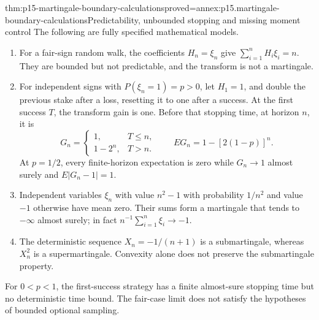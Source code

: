 \begin{hbtheorem}{thm:p15-martingale-boundary-calculations}{proved=annex:p15.martingale-boundary-calculations}{Predictability, unbounded stopping and missing moment control}
The following are fully specified mathematical models.
\begin{enumerate}
\item For a fair-sign random walk, the coefficients \(H_n=\xi_n\)
      give \(\sum_{i=1}^nH_i\xi_i=n\). They are bounded but not predictable,
      and the transform is not a martingale.
\item For independent signs with \(P(\xi_n=1)=p>0\), let \(H_1=1\),
      and double the previous stake after a loss, resetting it to one
      after a success. At the first success \(T\), the transform gain is one.
      Before that stopping time, at horizon \(n\), it is
      \[
        G_n=\begin{cases}1,&T\leq n,\\1-2^n,&T>n.\end{cases}
        \qquad EG_n=1-[2(1-p)]^n.
      \]
      At \(p=1/2\), every finite-horizon expectation is zero while
      \(G_n\to1\) almost surely and \(E|G_n-1|=1\).
\item Independent variables \(\xi_n\) with value \(n^2-1\) with
      probability \(1/n^2\) and value \(-1\) otherwise have mean zero.
      Their sums form a martingale that tends to \(-\infty\)
      almost surely; in fact \(n^{-1}\sum_{i=1}^n\xi_i\to-1\).
\item The deterministic sequence \(X_n=-1/(n+1)\) is a submartingale,
      whereas \(X_n^2\) is a supermartingale. Convexity alone does
      not preserve the submartingale property.
\end{enumerate}
For \(0<p<1\), the first-success strategy has a finite almost-sure
stopping time but no deterministic time bound. The fair-case limit
does not satisfy the hypotheses of bounded optional sampling.
\end{hbtheorem}

